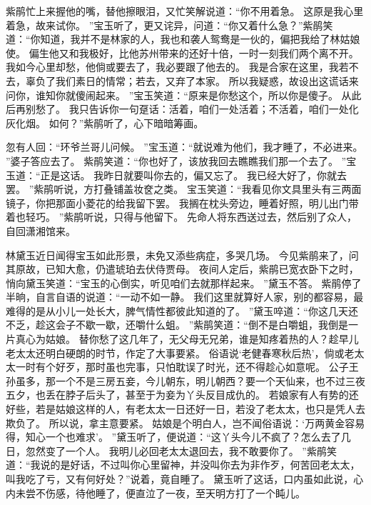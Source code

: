 紫鹃忙上来握他的嘴，替他擦眼泪，又忙笑解说道：“你不用着急。
这原是我心里着急，故来试你。
”宝玉听了，更又诧异，问道：“你又着什么急？”紫鹃笑道：“你知道，我并不是林家的人，我也和袭人鸳鸯是一伙的，偏把我给了林姑娘使。
偏生他又和我极好，比他苏州带来的还好十倍，一时一刻我们两个离不开。
我如今心里却愁，他倘或要去了，我必要跟了他去的。
我是合家在这里，我若不去，辜负了我们素日的情常；若去，又弃了本家。
所以我疑惑，故设出这谎话来问你，谁知你就傻闹起来。
”宝玉笑道：“原来是你愁这个，所以你是傻子。
从此后再别愁了。
我只告诉你一句趸话：活着，咱们一处活着；不活着，咱们一处化灰化烟。
如何？”紫鹃听了，心下暗暗筹画。
\par
忽有人回：“环爷兰哥儿问候。
”宝玉道：“就说难为他们，我才睡了，不必进来。
”婆子答应去了。
紫鹃笑道：“你也好了，该放我回去瞧瞧我们那一个去了。
”宝玉道：“正是这话。
我昨日就要叫你去的，偏又忘了。
我已经大好了，你就去罢。
”紫鹃听说，方打叠铺盖妆奁之类。
宝玉笑道：“我看见你文具里头有三两面镜子，你把那面小菱花的给我留下罢。
我搁在枕头旁边，睡着好照，明儿出门带着也轻巧。
”紫鹃听说，只得与他留下。
先命人将东西送过去，然后别了众人，自回潇湘馆来。
\par
林黛玉近日闻得宝玉如此形景，未免又添些病症，多哭几场。
今见紫鹃来了，问其原故，已知大愈，仍遣琥珀去伏侍贾母。
夜间人定后，紫鹃已宽衣卧下之时，悄向黛玉笑道：“宝玉的心倒实，听见咱们去就那样起来。
”黛玉不答。
紫鹃停了半晌，自言自语的说道：“一动不如一静。
我们这里就算好人家，别的都容易，最难得的是从小儿一处长大，脾气情性都彼此知道的了。
”黛玉啐道：“你这几天还不乏，趁这会子不歇一歇，还嚼什么蛆。
”紫鹃笑道：“倒不是白嚼蛆，我倒是一片真心为姑娘。
替你愁了这几年了，无父母无兄弟，谁是知疼着热的人？趁早儿老太太还明白硬朗的时节，作定了大事要紧。
俗语说‘老健春寒秋后热’，倘或老太太一时有个好歹，那时虽也完事，只怕耽误了时光，还不得趁心如意呢。
公子王孙虽多，那一个不是三房五妾，今儿朝东，明儿朝西？要一个天仙来，也不过三夜五夕，也丢在脖子后头了，甚至于为妾为丫头反目成仇的。
若娘家有人有势的还好些，若是姑娘这样的人，有老太太一日还好一日，若没了老太太，也只是凭人去欺负了。
所以说，拿主意要紧。
姑娘是个明白人，岂不闻俗语说：‘万两黄金容易得，知心一个也难求’。
”黛玉听了，便说道：“这丫头今儿不疯了？怎么去了几日，忽然变了一个人。
我明儿必回老太太退回去，我不敢要你了。
”紫鹃笑道：“我说的是好话，不过叫你心里留神，并没叫你去为非作歹，何苦回老太太，叫我吃了亏，又有何好处？”说着，竟自睡了。
黛玉听了这话，口内虽如此说，心内未尝不伤感，待他睡了，便直泣了一夜，至天明方打了一个盹儿。
